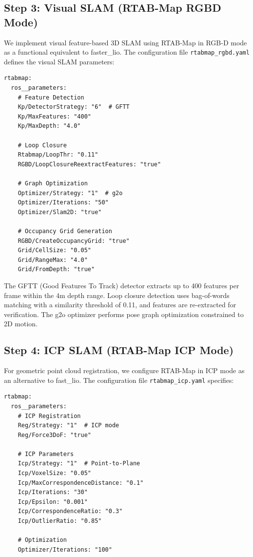 \documentclass[conference]{IEEEtran}
\begin{document}
\subsection{Step 3: Visual SLAM (RTAB-Map RGBD Mode)}

We implement visual feature-based 3D SLAM using RTAB-Map in RGB-D mode as a functional equivalent to faster\_lio. The configuration file \texttt{rtabmap\_rgbd.yaml} defines the visual SLAM parameters:

\begin{lstlisting}[caption={Visual SLAM Configuration (rtabmap\_rgbd.yaml)}]
rtabmap:
  ros__parameters:
    # Feature Detection
    Kp/DetectorStrategy: "6"  # GFTT
    Kp/MaxFeatures: "400"
    Kp/MaxDepth: "4.0"

    # Loop Closure
    Rtabmap/LoopThr: "0.11"
    RGBD/LoopClosureReextractFeatures: "true"

    # Graph Optimization
    Optimizer/Strategy: "1"  # g2o
    Optimizer/Iterations: "50"
    Optimizer/Slam2D: "true"

    # Occupancy Grid Generation
    RGBD/CreateOccupancyGrid: "true"
    Grid/CellSize: "0.05"
    Grid/RangeMax: "4.0"
    Grid/FromDepth: "true"
\end{lstlisting}

The GFTT (Good Features To Track) detector extracts up to 400 features per frame within the 4m depth range. Loop closure detection uses bag-of-words matching with a similarity threshold of 0.11, and features are re-extracted for verification. The g2o optimizer performs pose graph optimization constrained to 2D motion.

\subsection{Step 4: ICP SLAM (RTAB-Map ICP Mode)}

For geometric point cloud registration, we configure RTAB-Map in ICP mode as an alternative to fast\_lio. The configuration file \texttt{rtabmap\_icp.yaml} specifies:

\begin{lstlisting}[caption={ICP SLAM Configuration (rtabmap\_icp.yaml)}]
rtabmap:
  ros__parameters:
    # ICP Registration
    Reg/Strategy: "1"  # ICP mode
    Reg/Force3DoF: "true"

    # ICP Parameters
    Icp/Strategy: "1"  # Point-to-Plane
    Icp/VoxelSize: "0.05"
    Icp/MaxCorrespondenceDistance: "0.1"
    Icp/Iterations: "30"
    Icp/Epsilon: "0.001"
    Icp/CorrespondenceRatio: "0.3"
    Icp/OutlierRatio: "0.85"

    # Optimization
    Optimizer/Iterations: "100"
\end{lstlisting}
\end{document}
